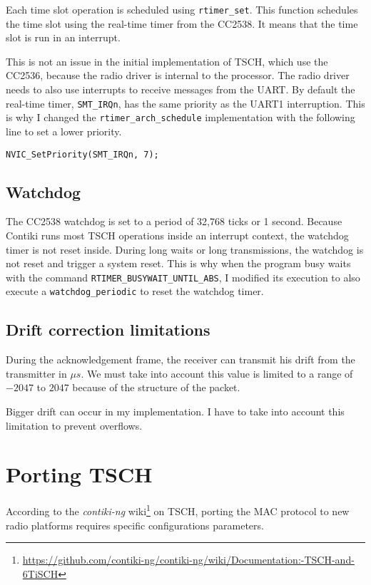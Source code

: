 Each time slot operation is scheduled using \lstinline{rtimer_set}.
This function schedules the time slot using the real-time timer from the CC2538.
It means that the time slot is run in an interrupt.

This is not an issue in the initial implementation of TSCH, which use the
CC2536, because the radio driver is internal to the processor.
The radio driver needs to also use interrupts to receive messages from the UART.
By default the real-time timer, \lstinline{SMT_IRQn}, has the same priority as
the UART1 interruption. 
This is why I changed the \lstinline{rtimer_arch_schedule} implementation with
the following line to set a lower priority.

\begin{lstlisting}
NVIC_SetPriority(SMT_IRQn, 7); 
\end{lstlisting}

\subsection{Watchdog}

The CC2538 watchdog is set to a period of 32,768 ticks or 1 second. 
Because Contiki runs most TSCH operations inside an interrupt
context, the watchdog timer is not reset inside.
During long waits or long transmissions, the watchdog is not reset and trigger
a system reset.
This is why when the program busy waits with the command
\lstinline{RTIMER_BUSYWAIT_UNTIL_ABS}, I modified its execution to also execute
a \lstinline{watchdog_periodic} to reset the watchdog timer.

\subsection{Drift correction limitations}

During the acknowledgement frame, the receiver can transmit his drift from the
transmitter in $\mu s$. 
We must take into account this value is limited to a range of $-2047$ to
$2047$ because of the structure of the packet.

Bigger drift can occur in my implementation. 
I have to take into account this limitation to prevent overflows.

\section{Porting TSCH}

According to the \emph{contiki-ng}
wiki\footnote{\url{https://github.com/contiki-ng/contiki-ng/wiki/Documentation:-TSCH-and-6TiSCH}}
on TSCH, porting the MAC protocol to new radio platforms requires specific
configurations parameters.

